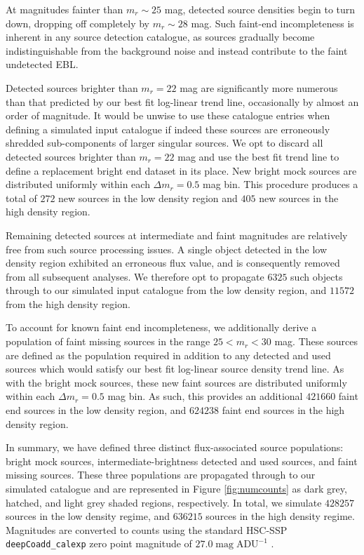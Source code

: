 \documentclass[fleqn,usenatbib,useAMS]{mnras}
\begin{document}
At magnitudes fainter than $m_r\sim25$ mag, detected source densities begin to turn down, dropping off completely by $m_r\sim28$ mag. Such faint-end incompleteness is inherent in any source detection catalogue, as sources gradually become indistinguishable from the background noise and instead contribute to the faint undetected EBL. 

Detected sources brighter than $m_r=22$ mag are significantly more numerous than that predicted by our best fit log-linear trend line, occasionally by almost an order of magnitude. It would be unwise to use these catalogue entries when defining a simulated input catalogue if indeed these sources are erroneously shredded sub-components of larger singular sources. We opt to discard all detected sources brighter than $m_r=22$ mag and use the best fit trend line to define a replacement bright end dataset in its place. New bright mock sources are distributed uniformly within each $\Delta m_r=0.5$ mag bin. This procedure produces a total of $272$ new sources in the low density region and $405$ new sources in the high density region. 

Remaining detected sources at intermediate and faint magnitudes are relatively free from such source processing issues. A single object detected in the low density region exhibited an erroneous flux value, and is consequently removed from all subsequent analyses. We therefore opt to propagate $6325$ such objects through to our simulated input catalogue from the low density region, and $11572$ from the high density region. 

To account for known faint end incompleteness, we additionally derive a population of faint missing sources in the range $25<m_r<30$ mag. These sources are defined as the population required in addition to any detected and used sources which would satisfy our best fit log-linear source density trend line. As with the bright mock sources, these new faint sources are distributed uniformly within each $\Delta m_r=0.5$ mag bin. As such, this provides an additional $421660$ faint end sources in the low density region, and $624238$ faint end sources in the high density region. 

In summary, we have defined three distinct flux-associated source populations: bright mock sources, intermediate-brightness detected and used sources, and faint missing sources. These three populations are propagated through to our simulated catalogue and are represented in Figure \ref{fig:numcounts} as dark grey, hatched, and light grey shaded regions, respectively. In total, we simulate $428257$ sources in the low density regime, and $636215$ sources in the high density regime. Magnitudes are converted to counts using the standard HSC-SSP \texttt{deepCoadd\_calexp} zero point magnitude of $27.0\;\mathrm{mag}\;\mathrm{ADU}^{-1}$ \citep{Aihara2018b}.
\end{document}
